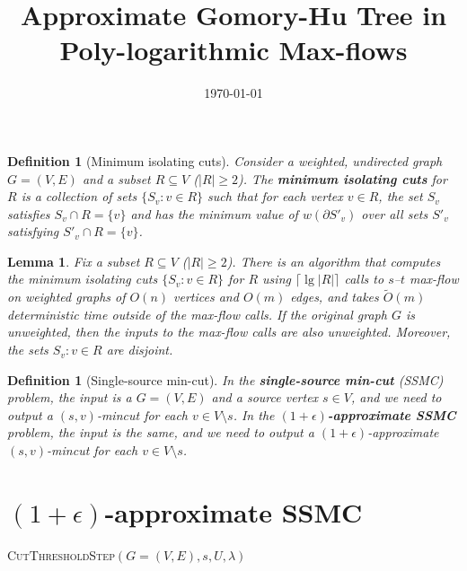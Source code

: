 \documentclass{article}
\newcommand{\sm}{\setminus}
\newcommand{\s}{\subseteq}
\newcommand{\e}{\epsilon}
\newcommand{\la}{\lambda}
\newcommand{\pt}{\partial}
\newcommand{\lf}{\lfloor}
\newcommand{\rf}{\rfloor}
\newcommand{\lc}{\lceil}
\newcommand{\rc}{\rceil}
\newcommand{\1}{\mathbbm 1}
\newtheorem{lemma}[theorem]{Lemma}
\newtheorem{definition}[theorem]{Definition}
\newcommand{\BL}{\begin{lemma}}
\newcommand{\EL}{\end{lemma}}
\newcommand{\BD}{\begin{definition}}
\newcommand{\ED}{\end{definition}}
\newcommand{\tO}{\tilde{O}}
\newcommand{\linel}[1]{\label{line:#1}}
\renewcommand{\emph}[1]{\textbf{\textup{#1}}}
\begin{document}
\title{Approximate Gomory-Hu Tree in Poly-logarithmic Max-flows}
\author{}
\date{\today}
\maketitle

\BD[Minimum isolating cuts]
Consider a weighted, undirected graph $G=(V,E)$ and a subset $R\s V$ ($|R|\ge2$). The \emph{minimum isolating cuts} for $R$ is a collection of sets $\{S_v:v\in R\}$ such that for each vertex $v\in R$, the set $S_v$ satisfies $S_v\cap R=\{v\}$ and has the minimum value of $w(\pt S'_v)$ over all sets $S'_v$ satisfying $S'_v\cap R=\{v\}$.
\ED

\BL
Fix a subset $R\s V$ ($|R|\ge2$). There is an algorithm that computes the minimum isolating cuts $\{S_v:v\in R\}$ for $R$ using $\lc\lg|R|\rc$ calls to $s$--$t$ max-flow on weighted graphs of $O(n)$ vertices and $O(m)$ edges, and takes $\tO(m)$ deterministic time outside of the max-flow calls. If the original graph $G$ is unweighted, then the inputs to the max-flow calls are also unweighted. Moreover, the sets $S_v:v\in R$ are disjoint.
\EL

\BD[Single-source min-cut]
In the \emph{single-source min-cut} (SSMC) problem, the input is a $G=(V,E)$ and a source vertex $s\in V$, and we need to output a $(s,v)$-mincut for each $v\in V\sm s$. In the \emph{$(1+\e)$-approximate SSMC} problem, the input is the same, and we need to output a $(1+\e)$-approximate $(s,v)$-mincut for each $v\in V\sm s$.
\ED

\section{$(1+\e)$-approximate SSMC}


\begin{algorithm}
\caption{\textsc{CutThresholdStep}$(G=(V,E),s,U,\la)$} \label{alg:main}
\end{algorithm}
\end{document}
